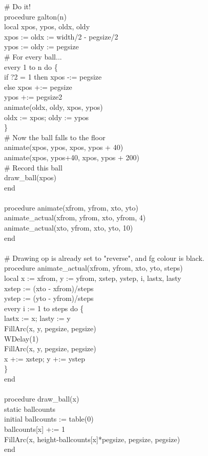 {\# Do it! \\
procedure galton(n) \\
\>local xpos, ypos, oldx, oldy \\
\>xpos := oldx := width/2 - pegsize/2 \\
\>ypos := oldy := pegsize \\
\>\# For every ball... \\
\>every 1 to n do \{ \\
\>\>if ?2 = 1 then xpos -:= pegsize \\
\>\>else xpos +:= pegsize \\
\>\>ypos +:= pegsize2 \\
\>\>animate(oldx, oldy, xpos, ypos) \\
\>\>oldx := xpos; oldy := ypos \\
\>\>\} \\
\>\# Now the ball falls to the floor \\
\>animate(xpos, ypos, xpos, ypos + 40) \\
\>animate(xpos, ypos+40, xpos, ypos + 200) \\
\>\# Record this ball \\
\>draw\_ball(xpos) \\
end\\
\ \\
procedure animate(xfrom, yfrom, xto, yto) \\
\>animate\_actual(xfrom, yfrom, xto, yfrom, 4) \\
\>animate\_actual(xto, yfrom, xto, yto, 10) \\
end\\
\ \\
\# Drawing op is already set to "reverse",
and fg colour is black. \\
procedure animate\_actual(xfrom, yfrom, xto, yto, steps) \\
\>local x := xfrom, y := yfrom, xstep, ystep, i, lastx, lasty \\
\>xstep := (xto - xfrom)/steps \\
\>ystep := (yto - yfrom)/steps \\
\>every i := 1 to steps do \{ \\
\>\>lastx := x; lasty := y \\
\>\>FillArc(x, y, pegsize, pegsize) \\
\>\>WDelay(1) \\
\>\>FillArc(x, y, pegsize, pegsize) \\
\>\>x +:= xstep; y +:= ystep \\
\>\>\} \\
end\\
\ \\
procedure draw\_ball(x) \\
\>static ballcounts \\
\>initial ballcounts := table(0) \\
\>ballcounts[x] +:= 1 \\
\>FillArc(x, height-ballcounts[x]*pegsize, pegsize, pegsize) \\
end
}

